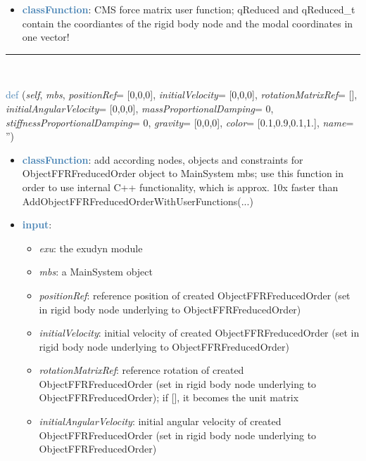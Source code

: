 \begin{itemize}[leftmargin=1.4cm]
\begin{itemize}[leftmargin=1.4cm]
\begin{itemize}[leftmargin=1.4cm]
\begin{itemize}[leftmargin=0.5cm]
\begin{itemize}[leftmargin=1.4cm]
\begin{itemize}[leftmargin=1.4cm]
\begin{itemize}[leftmargin=1.4cm]
\begin{itemize}[leftmargin=0.5cm]
\begin{itemize}[leftmargin=0.7cm]
\item[--]\textcolor{steelblue}{\bf classFunction}: CMS force matrix user function; qReduced and qReduced_t contain the coordiantes of the rigid body node and the modal coordinates in one vector!
\vspace{12pt}\end{itemize}
%
\noindent\rule{8cm}{0.75pt}\vspace{1pt} \\ 
\begin{flushleft}
\noindent \textcolor{steelblue}{def {\bf {}}}\label{sec:FEM:ObjectFFRFreducedOrderInterface:AddObjectFFRFreducedOrder}
({\it self}, {\it mbs}, {\it positionRef}= [0,0,0], {\it initialVelocity}= [0,0,0], {\it rotationMatrixRef}= [], {\it initialAngularVelocity}= [0,0,0], {\it massProportionalDamping}= 0, {\it stiffnessProportionalDamping}= 0, {\it gravity}= [0,0,0], {\it color}= [0.1,0.9,0.1,1.], {\it name}= '')
\end{flushleft}
\setlength{\itemindent}{0.7cm}
\begin{itemize}[leftmargin=0.7cm]
\item[--]\textcolor{steelblue}{\bf classFunction}: add according nodes, objects and constraints for ObjectFFRFreducedOrder object to MainSystem mbs; use this function in order to use internal C++ functionality, which is approx. 10x faster than AddObjectFFRFreducedOrderWithUserFunctions(...)
\item[--]\textcolor{steelblue}{\bf input}: \vspace{-6pt}
\begin{itemize}[leftmargin=1.2cm]
\setlength{\itemindent}{-0.7cm}
\item[]{\it exu}: the exudyn module
\item[]{\it mbs}: a MainSystem object
\item[]{\it positionRef}: reference position of created ObjectFFRFreducedOrder (set in rigid body node underlying to ObjectFFRFreducedOrder)
\item[]{\it initialVelocity}: initial velocity of created ObjectFFRFreducedOrder (set in rigid body node underlying to ObjectFFRFreducedOrder)
\item[]{\it rotationMatrixRef}: reference rotation of created ObjectFFRFreducedOrder (set in rigid body node underlying to ObjectFFRFreducedOrder); if [], it becomes the unit matrix
\item[]{\it initialAngularVelocity}: initial angular velocity of created ObjectFFRFreducedOrder (set in rigid body node underlying to ObjectFFRFreducedOrder)

\end{itemize}
\end{itemize}
\end{itemize}
\end{itemize}
\end{itemize}
\end{itemize}
\end{itemize}
\end{itemize}
\end{itemize}
\end{itemize}
